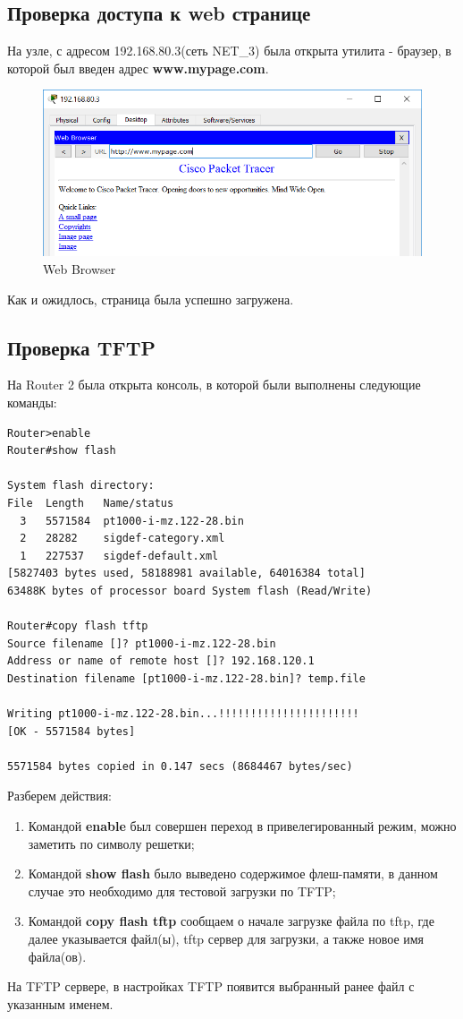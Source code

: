 \documentclass[a4paper, 12pt]{article}		%
\begin{document}
\subsection{Проверка доступа к web странице}
На узле, с адресом 192.168.80.3(сеть NET\_3) была открыта утилита - браузер, в которой был введен адрес \textbf{www.mypage.com}.
\begin{figure}[H]
  \centering
  \includegraphics[width=.8\textwidth]{img/web}
  \caption{Web Browser}
\end{figure}
Как и ожидлось, страница была успешно загружена.

\subsection{Проверка TFTP}
На Router 2 была открыта консоль, в которой были выполнены следующие команды:
\begin{lstlisting}[language={}]
Router>enable
Router#show flash

System flash directory:
File  Length   Name/status
  3   5571584  pt1000-i-mz.122-28.bin
  2   28282    sigdef-category.xml
  1   227537   sigdef-default.xml
[5827403 bytes used, 58188981 available, 64016384 total]
63488K bytes of processor board System flash (Read/Write)

Router#copy flash tftp
Source filename []? pt1000-i-mz.122-28.bin
Address or name of remote host []? 192.168.120.1
Destination filename [pt1000-i-mz.122-28.bin]? temp.file

Writing pt1000-i-mz.122-28.bin...!!!!!!!!!!!!!!!!!!!!!!
[OK - 5571584 bytes]

5571584 bytes copied in 0.147 secs (8684467 bytes/sec)
\end{lstlisting}
Разберем действия:
\begin{enumerate}
\item Командой \textbf{enable} был совершен переход в привелегированный режим, можно заметить по символу решетки;
\item Командой \textbf{show flash} было выведено содержимое флеш-памяти, в данном случае это необходимо для тестовой загрузки по TFTP;
\item Командой \textbf{copy flash tftp} сообщаем о начале загрузке файла по tftp, где далее указывается файл(ы), tftp сервер для загрузки, а также новое имя файла(ов). 
\end{enumerate}
На TFTP сервере, в настройках TFTP появится выбранный ранее файл с указанным именем.
\end{document}
